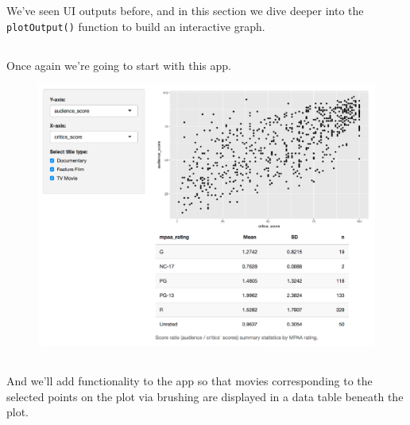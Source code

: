 \documentclass[
  letterpaper,
  DIV=11,
  numbers=noendperiod]{scrreprt}
\begin{document}
We've seen UI outputs before, and in this section we dive deeper into
the \texttt{plotOutput()} function to build an interactive graph.

\hypertarget{section-27}{%
\subsection{}\label{section-27}}

Once again we're going to start with this app.

\begin{figure}

{\centering \includegraphics[width=1\textwidth,height=\textheight]{./images/app-summary-table.png}

}

\end{figure}

\hypertarget{section-28}{%
\subsection{}\label{section-28}}

And we'll add functionality to the app so that movies corresponding to
the selected points on the plot via brushing are displayed in a data
table beneath the plot.
\end{document}
